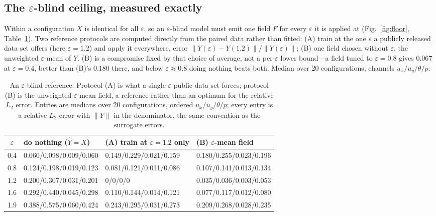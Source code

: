 \documentclass[preprint,11pt,a4paper,times,doubleblind]{elsarticle}
\begin{document}
\subsection{The $\varepsilon$-blind ceiling, measured exactly}
\label{sec:floor}

Within a configuration $X$ is identical for all $\varepsilon$, so an $\varepsilon$-blind model must
emit one field $F$ for every $\varepsilon$ it is applied at (Fig.~\ref{fig:floor},
Table~\ref{tab:floor}). Two reference protocols are computed directly from the paired data rather
than fitted: (A) train at the one $\varepsilon$ a publicly released data set offers (here
$\varepsilon=1.2$) and apply it everywhere, error $\|Y(\varepsilon)-Y(1.2)\|/\|Y(\varepsilon)\|$;
(B) one field chosen without $\varepsilon$, the unweighted $\varepsilon$-mean of $Y$. (B) is a
compromise fixed by that choice of average, not a per-$\varepsilon$ lower
bound---a field tuned to $\varepsilon=0.8$ gives $0.067$ at $\varepsilon=0.4$, better than (B)'s
$0.180$ there, and below $\varepsilon\approx0.8$ doing nothing beats both. Median over 20
configurations, channels $u_x/u_y/\theta/p$:

\begin{table}[htbp]
\centering
\footnotesize
\setlength{\tabcolsep}{4pt}
\caption{An $\varepsilon$-blind reference. Protocol (A) is what a single-$\varepsilon$ public
data set forces; protocol (B) is the unweighted $\varepsilon$-mean field, a reference rather than
an optimum for the relative $L_2$ error. Entries are medians over 20 configurations, ordered
$u_x/u_y/\theta/p$; every entry is a relative
$L_2$ error with $\|Y\|$ in the denominator, the same convention as the surrogate errors.}
\label{tab:floor}
\setlength{\tabcolsep}{3pt}
\begin{tabular}{@{}c p{3.7cm}p{3.7cm}p{3.7cm}@{}}
\toprule
$\varepsilon$ & do nothing ($\hat Y=X$) & (A) train at $\varepsilon=1.2$ only & (B)
$\varepsilon$-mean field\\
\midrule
0.4 & 0.060/0.098/0.009/0.060 & 0.149/0.229/0.021/0.159 & 0.180/0.255/0.023/0.196\\
0.8 & 0.124/0.198/0.019/0.123 & 0.081/0.121/0.011/0.086 & 0.107/0.141/0.013/0.134\\
1.2 & 0.200/0.307/0.031/0.201 & 0/0/0/0 & 0.035/0.036/0.003/0.053\\
1.6 & 0.292/0.440/0.045/0.298 & 0.110/0.144/0.014/0.121 & 0.077/0.117/0.012/0.080\\
1.9 & 0.388/0.575/0.060/0.424 & 0.243/0.295/0.031/0.273 & 0.209/0.268/0.028/0.235\\
\bottomrule
\end{tabular}
\end{table}
\end{document}
